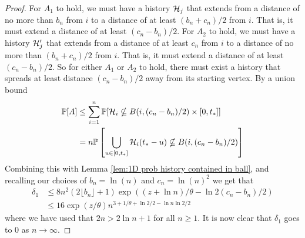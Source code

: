 \begin{proof}
		For $A_1$ to hold, we must have a history $\mathcal{H}_j$ that extends from a distance of no more than $b_n$ from $i$ to a distance of at least $(b_n + c_n)/2$ from $i$. That is, it must extend a distance of at least $(c_n - b_n)/2$. For $A_2$ to hold, we must have a history $\mathcal{H}_j'$ that extends from a distance of at least $c_n$ from $i$ to a distance of no more than $(b_n + c_n)/2$ from $i$. That is, it must extend a distance of at least $(c_n - b_n)/2$. So for either $A_1$ or $A_2$ to hold, there must exist a history that spreads at least distance $(c_n - b_n) / 2$ away from its starting vertex. 
		By a union bound
		\begin{align}
			\mathbb{P}[A] &\leq \sum_{i = 1}^n \mathbb{P}[\mathcal{H}_i \nsubseteq B(i, (c_n - b_n)/2) \times [0, t_*]]\\
				&= n \mathbb{P}\left[\bigcup_{u \in [0, t_*]}\mathcal{H}_i(t_* - u) \nsubseteq B(i, (c_n - b_n)/2)\right]
		\end{align}
		Combining this with Lemma \ref{lem:1D prob history contained in ball}, and recalling our choices of $b_n = \ln(n)$ and $c_n = \ln(n)^2$ we get that
		\begin{align}
			\delta_1 &\leq 8n^2(2\lfloor b_n\rfloor + 1) \exp\left((z + \ln n)/\theta - \ln 2(c_n - b_n) /2 \right)\\
			&\leq 16 \exp(z/\theta) n^{3+ 1/\theta + \ln2/2 -\ln n \ln 2/ 2}
		\end{align}
		where we have used that $2n > 2 \ln n + 1$ for all $n \geq 1$. It is now clear that $\delta_1$ goes to $0$ as $n \rightarrow \infty$.
	\end{proof}

